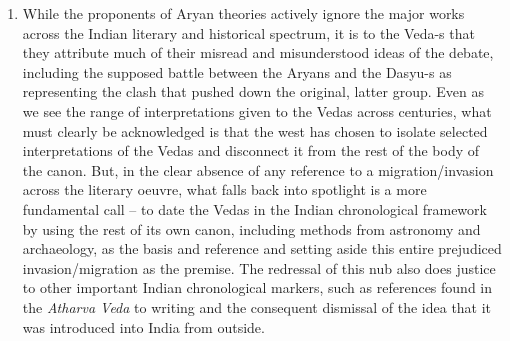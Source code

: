 \begin{enumerate}
 \item While the proponents of Aryan theories actively ignore the major works across the Indian literary and historical spectrum, it is to the Veda-s that they attribute much of their misread and misunderstood ideas of the debate, including the supposed battle between the Aryans and the Dasyu-s as representing the clash that pushed down the original, latter group. Even as we see the range of interpretations given to the Vedas across centuries, what must clearly be acknowledged is that the west has chosen to isolate selected interpretations of the Vedas and disconnect it from the rest of the body of the canon. But, in the clear absence of any reference to a migration/invasion across the literary oeuvre, what falls back into spotlight is a more fundamental call – to date the Vedas in the Indian chronological framework by using the rest of its own canon, including methods from astronomy and archaeology, as the basis and reference and setting aside this entire prejudiced invasion/migration as the premise. The redressal of this nub also does justice to other important Indian chronological markers, such as references found in the \textit{Atharva Veda} to writing and the consequent dismissal of the idea that it was introduced into India from outside.


\end{enumerate}
